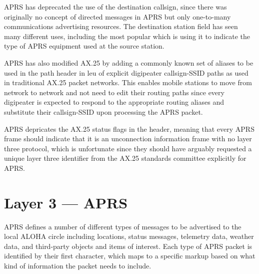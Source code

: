 APRS has deprecated the use of the destination callsign, since there was
originally no concept of directed messages in APRS but only one-to-many
communications advertising resources. The destination station field has
seen many different uses, including the most popular which is using it to
indicate the type of APRS equipment used at the source station.

APRS has also modified AX.25 by adding a commonly known set of aliases 
to be used in the path header in leu of explicit digipeater callsign-SSID
paths as used in traditional AX.25 packet networks. This enables mobile 
stations to move from network to network and not need to edit their
routing paths since every digipeater is expected to respond to the 
appropriate routing aliases and substitute their callsign-SSID upon 
processing the APRS packet.

APRS depricates the AX.25 status flags in the header, meaning that every
APRS frame should indicate that it is an unconnection information frame
with no layer three protocol, which is unfortunate since they should
have arguably requested a unique layer three identifier from the AX.25
standards committee explicitly for APRS. 

\section{Layer 3 --- APRS}

APRS defines a number of different types of messages to be advertised to
the local ALOHA circle including locations, status messages, telemetry data,
weather data, and third-party objects and items of interest. Each type of
APRS packet is identified by their first character, which maps to a 
specific markup based on what kind of information the packet needs to 
include.

